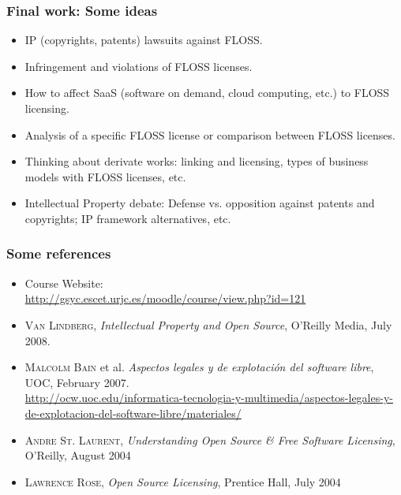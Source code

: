 \documentclass{beamer}
\begin{document}

\begin{frame}
\frametitle{Final work: Some ideas}

\begin{itemize}
\item IP (copyrights, patents) lawsuits against FLOSS.
\item Infringement and violations of FLOSS licenses.
\item How to affect SaaS (software on demand, cloud computing, etc.) to FLOSS licensing.
\item Analysis of a specific FLOSS license or comparison between FLOSS licenses.
\item Thinking about derivate works: linking and licensing, types of business models with FLOSS licenses, etc.
\item Intellectual Property debate: Defense vs. opposition against patents and copyrights; IP framework alternatives, etc.
\end{itemize}

\end{frame}


\begin{frame}
\frametitle{Some references}

\begin{itemize}
\item Course Website: \\
  {\footnotesize \url{http://gsyc.escet.urjc.es/moodle/course/view.php?id=121}}
\item \textsc{Van Lindberg}, \textit{Intellectual Property and Open Source}, O'Reilly Media, July 2008.
\item \textsc{Malcolm Bain} et al. \textit{Aspectos legales y de explotación del software libre}, UOC, February 2007. \\
{\footnotesize \url{http://ocw.uoc.edu/informatica-tecnologia-y-multimedia/aspectos-legales-y-de-explotacion-del-software-libre/materiales/}}
\item \textsc{Andre St. Laurent}, \textit{Understanding Open Source \& Free Software Licensing}, O'Reilly, August 2004 
\item \textsc{Lawrence Rose}, \textit{Open Source Licensing}, Prentice Hall, July 2004 
\end{itemize}

\end{frame}


\end{document}
